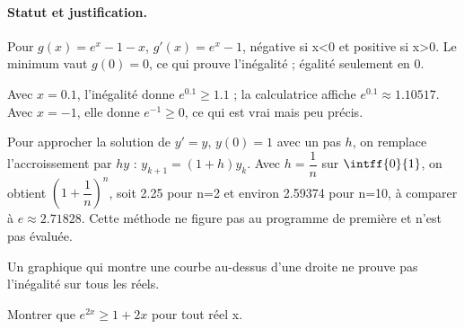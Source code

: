 \paragraph{Statut et justification.} Pour $g(x)=e^x-1-x$, $g\prime(x)=e^x-1$, négative si x<0 et positive si x>0. Le minimum vaut $g(0)=0$, ce qui prouve l’inégalité ; égalité seulement en 0.
\begin{example}Avec $x=\num{0,1}$, l’inégalité donne $e^{\num{0,1}}\geq\num{1,1}$ ; la calculatrice affiche $e^{\num{0,1}}\approx\num{1,10517}$. Avec $x=-1$, elle donne $e^{-1}\geq0$, ce qui est vrai mais peu précis.\end{example}\label{C09-EX5}
\begin{beyond}Pour approcher la solution de $y\prime=y$, $y(0)=1$ avec un pas $h$, on remplace l’accroissement par $hy$ : $y_{k+1}=(1+h)y_k$. Avec $h=\dfrac1n$ sur $\intff{0}{1}$, on obtient $\left(1+\dfrac1n\right)^n$, soit \num{2,25} pour n=2 et environ \num{2,59374} pour n=10, à comparer à $e\approx\num{2,71828}$. Cette méthode ne figure pas au programme de première et n’est pas évaluée.\end{beyond}
\begin{pitfall}Un graphique qui montre une courbe au-dessus d’une droite ne prouve pas l’inégalité sur tous les réels.\end{pitfall}
\begin{application}Montrer que $e^{2x}\geq1+2x$ pour tout réel x.\end{application}\label{C09-AP5}
\mxnewpage
